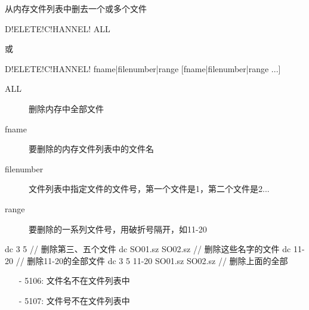 \label{cmd:deletechannel}

从内存文件列表中删去一个或多个文件

\begin{SACSTX}
D!ELETE!C!HANNEL! ALL
\end{SACSTX}
或
\begin{SACSTX}
D!ELETE!C!HANNEL! fname|filenumber|range [fname|filenumber|range ...]
\end{SACSTX}

\begin{description}
\item [ALL] 删除内存中全部文件
\item [fname] 要删除的内存文件列表中的文件名
\item [filenumber] 文件列表中指定文件的文件号，第一个文件是1，第二个文件是2...
\item [range] 要删除的一系列文件号，用破折号隔开，如11-20
\end{description}

\begin{SACCode}
  dc 3 5                         // 删除第三、五个文件
  dc SO01.sz SO02.sz             // 删除这些名字的文件
  dc 11-20                       // 删除11-20的全部文件
  dc 3 5 11-20 SO01.sz SO02.sz   // 删除上面的全部
\end{SACCode}

\begin{itemize}
\item[-]5106: 文件名不在文件列表中
\item[-]5107: 文件号不在文件列表中
\end{itemize}

